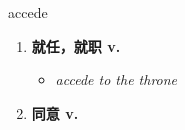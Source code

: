
\begin{frame}
{\huge accede}
\begin{center}
\begin{enumerate}\Large
  \item \textbf{就任，就职 v.}
  \begin{itemize}
    \item \em{\Large{accede to the throne}}
  \end{itemize}
  \item \textbf{同意 v.}
\end{enumerate}
\end{center}
\end{frame}

